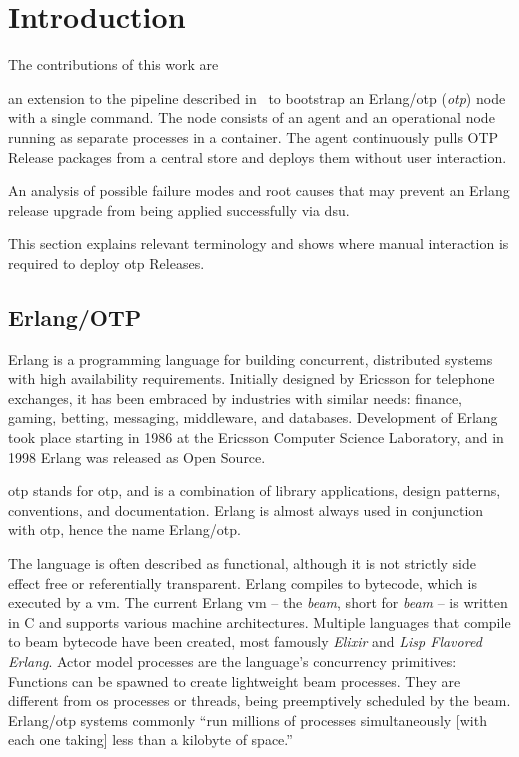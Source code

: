 \section{Introduction}

The contributions of this work are \begin{enumerate*}[label=(\roman*)]
  \item an extension to the pipeline described in~\cite{zak18} to bootstrap an Erlang/\acrshort{otp} (\emph{\acrlong{otp}}) node with a single command. The node consists of an agent and an operational node running as separate processes in a container. The agent continuously pulls OTP Release packages from a central store and deploys them without user interaction.
  \item An analysis of possible failure modes and root causes that may prevent an Erlang release upgrade from being applied successfully via \acrfull{dsu}.
\end{enumerate*} This section explains relevant terminology and shows where manual interaction is required to deploy \acrshort{otp} Releases.

\subsection{Erlang/OTP}

Erlang is a programming language for building concurrent, distributed systems with high availability requirements. Initially designed by Ericsson for telephone exchanges, it has been embraced by industries with similar needs: finance, gaming, betting, messaging, middleware, and databases. Development of Erlang took place starting in 1986 at the Ericsson Computer Science Laboratory, and in 1998 Erlang was released as Open Source.~\cite{armstrong2007history}

\acrshort{otp} stands for \acrlong{otp}, and is a combination of library applications, design patterns, conventions, and documentation. Erlang is almost always used in conjunction with \acrshort{otp}, hence the name Erlang/\acrshort{otp}.~\cite{ferd}

The language is often described as functional, although it is not strictly side effect free or referentially transparent. Erlang compiles to bytecode, which is executed by a \acrfull{vm}. The current Erlang \acrshort{vm} – the \emph{\acrshort{beam}}, short for \emph{\acrlong{beam}} – is written in C and supports various machine architectures. Multiple languages that compile to \acrshort{beam} bytecode have been created, most famously \emph{Elixir} and \emph{Lisp Flavored Erlang}. Actor model processes are the language's concurrency primitives: Functions can be spawned to create lightweight \acrshort{beam} processes. They are different from \acrfull{os} processes or threads, being preemptively scheduled by the \acrshort{beam}. Erlang/\acrshort{otp} systems commonly ``run millions of processes simultaneously [with each one taking] less than a kilobyte of space.''~\cite{larson}

